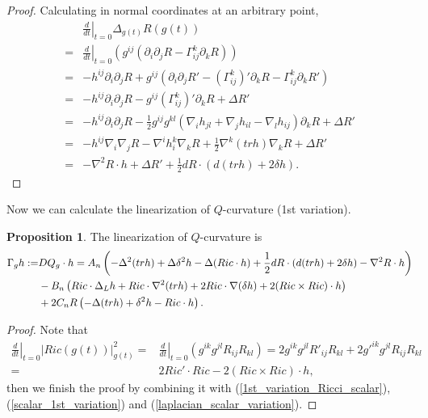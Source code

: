\documentclass[12pt]{amsart}
\theoremstyle{definition}
\newtheorem{proposition}[theorem]{Proposition}
\theoremstyle{remark}
\numberwithin{equation}{section}
\begin{document}
\begin{proof}
Calculating in normal coordinates at an arbitrary point,
\begin{align*}
&\left.\frac{d}{dt}\right|_{t=0}  \Delta_{g(t)} R(g(t)) \\
=& \left.\frac{d}{dt} \right|_{t=0}\left({g^{ij}(\partial_i\partial_j R-\Gamma^k_{ij}\partial_kR)}\right)\\
=& -h^{ij}\partial_i\partial_jR+g^{ij}(\partial_i\partial_j R'-(\Gamma^k_{ij})'\partial_k R-\Gamma^k_{ij}\partial_k R')\\
=& -h^{ij}\partial_i\partial_j R - g^{ij}(\Gamma^k_{ij})'\partial_k R+\Delta R'\\
=& -h^{ij}\partial_i\partial_j R - \frac{1}{2}g^{ij}g^{kl}(\nabla_ih_{jl}+\nabla_jh_{il}-\nabla_lh_{ij})\partial_kR+\Delta R'\\
=& -h^{ij}\nabla_i\nabla_jR-\nabla^ih^k_i\nabla_kR+\frac{1}{2}\nabla^k(trh)\nabla_kR+\Delta R'\\
=& - \nabla^2 R\cdot h + \Delta R' + \frac{1}{2} dR \cdot (d( tr h ) + 2\delta h).
\end{align*}

\end{proof}

Now we can calculate the linearization of $Q$-curvature (1st variation).\\

\begin{proposition}\label{Q_1st_variation}
The linearization of $Q$-curvature is
\begin{align}\label{Q_linearization}
\Gamma_g h :=& DQ_g \cdot h 
= A_n \left( - \Delta^2 (tr h) +  \Delta \delta^2 h  -
\Delta ( Ric \cdot h ) + \frac{1}{2} dR \cdot (d( tr h ) + 2\delta h) - \nabla^2 R\cdot h\right)
\\ \notag & - B_n \left(  Ric \cdot \Delta_L h + Ric \cdot
\nabla^2(tr h) + 2 Ric \cdot\nabla (\delta h)   +2 (Ric\times Ric) \cdot h
\right) \\
\notag &+ 2 C_n R \left( - \Delta (tr h) +  \delta^2 h - Ric \cdot h
\right).
\end{align}
\end{proposition}

\begin{proof}
Note that
\begin{align*}
\left.\frac{d}{dt}\right|_{t=0} |Ric(g(t))|_{g(t)}^2
=&\left.\frac{d}{dt}\right|_{t=0} \left(g^{ik}g^{jl}R_{ij}R_{kl}\right)
=2g^{ik}g^{jl}R'_{ij}R_{kl}+2g'^{ik}g^{jl}R_{ij}R_{kl}\\
=&2Ric' \cdot Ric - 2(Ric\times Ric) \cdot h,
\end{align*}
then we finish the proof by combining it with (\ref{1st_variation_Ricci_scalar}),  (\ref{scalar_1st_variation}) and (\ref{laplacian_scalar_variation}).
\end{proof}
\end{document}
